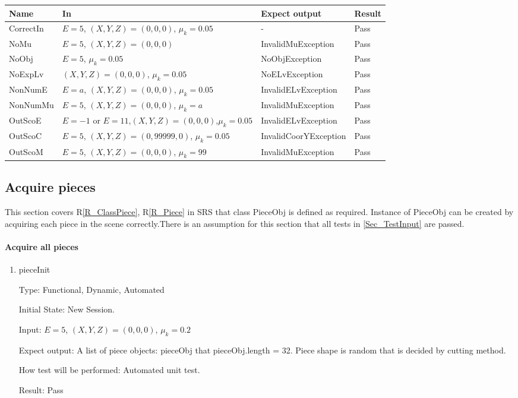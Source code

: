 \documentclass[12pt, titlepage]{article}
\newcommand{\rref}[1]{R\ref{#1}}
\begin{document}
\begin{center}
	\begin{tabular}{p{2cm} p{5cm} p{4cm} p{4cm}}
		\hline
		\textbf{Name} & \textbf{In} & \textbf{Expect output} & \textbf{Result} \\
		\hline
		CorrectIn &$E = 5$, $(X,Y,Z) = (0,0,0)$, $\mu_{k} = 0.05$ & - &Pass\\
		NoMu & $E = 5$, $(X,Y,Z) = (0,0,0)$  & InvalidMuException & Pass\\
		NoObj & $E = 5$, $\mu_{k} = 0.05$ & NoObjException & Pass\\
		NoExpLv &$(X,Y,Z) = (0,0,0)$, $\mu_{k} = 0.05$ & NoELvException & Pass\\
		NonNumE &$E = a$, $(X,Y,Z) = (0,0,0)$, $\mu_{k} = 0.05$ & InvalidELvException & Pass\\
		NonNumMu &$E = 5$, $(X,Y,Z) = (0,0,0)$, $\mu_{k} = a$ & InvalidMuException & Pass\\
		OutScoE & $E=-1$ or $E=11$,$(X,Y,Z) = (0,0,0)$,$\mu_{k} = 0.05$  & InvalidELvException & Pass\\
		OutScoC & $E = 5$, $(X,Y,Z) = (0,99999,0)$, $\mu_{k} = 0.05$ & InvalidCoorYException & Pass\\
		OutScoM & $E = 5$, $(X,Y,Z) = (0,0,0)$, $\mu_{k} = 99$ &InvalidMuException & Pass\\
		\hline		
	\end{tabular}
\end{center}

\subsection{Acquire pieces}
\label{Sec_testGravityCenter}

	This section covers \rref{R_ClassPiece}, \rref{R_Piece} in SRS that class PieceObj is defined as required. Instance of PieceObj can be created by acquiring each piece in the scene correctly.There is an assumption for this section that all tests in \ref{Sec_TestInput} are passed.\\

\paragraph{Acquire all pieces}

\begin{enumerate}
	
	\item{pieceInit}
	
	Type: Functional, Dynamic, Automated
	
	Initial State: New Session.
	
	Input: $E = 5$, $(X,Y,Z) = (0,0,0)$, $\mu_{k} = 0.2$
	
	Expect output: A list of piece objects: pieceObj that pieceObj.length = 32. Piece shape is random that is decided by cutting method.
	
	How test will be performed: Automated unit test.	
	
	Result: Pass
	
\end{enumerate}
\end{document}
